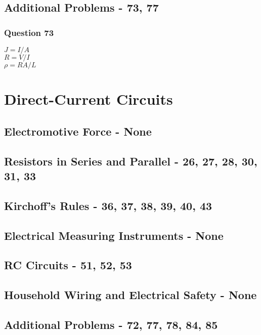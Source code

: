 \documentclass[12pt, letterpaper, twoside]{article}
\begin{document}
  \subsection*{Additional Problems - 73, 77}
    \subsubsection*{Question 73}
      $J = I/A$\\
      $R = V/I$\\
      $\rho = RA/L$
      
\section{Direct-Current Circuits} 
  \subsection{Electromotive Force - None}
  \subsection{Resistors in Series and Parallel - 26, 27, 28, 30, 31, 33}
  \subsection{Kirchoff's Rules - 36, 37, 38, 39, 40, 43}
  \subsection{Electrical Measuring Instruments - None}
  \subsection{RC Circuits - 51, 52, 53}
  \subsection{Household Wiring and Electrical Safety - None}
  \subsection*{Additional Problems - 72, 77, 78, 84, 85}
\end{document}
